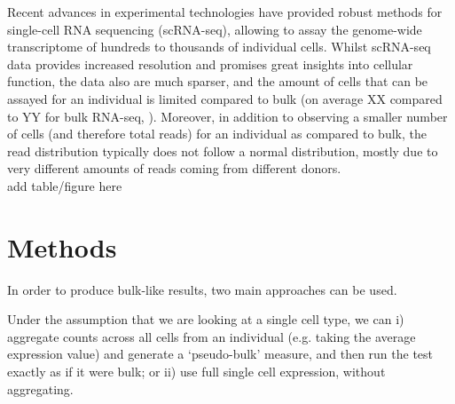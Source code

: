 
Recent advances in experimental technologies have provided robust methods for single-cell RNA sequencing (scRNA-seq), allowing to assay the genome-wide transcriptome of hundreds to thousands of individual cells. 
Whilst scRNA-seq data provides increased resolution and promises great insights into cellular function, the data also are much sparser, and the amount of cells that can be assayed for an individual is limited compared to bulk (on average XX compared to YY for bulk RNA-seq, \cite{}).
Moreover, in addition to observing a smaller number of cells (and therefore total reads) for an individual as compared to bulk, the read distribution typically does not follow a normal distribution, mostly due to very different amounts of reads coming from different donors. \\

add table/figure here


\section{Methods}

In order to produce bulk-like results, two main approaches can be used.

Under the assumption that we are looking at a single cell type, we can i) aggregate counts across all cells from an individual (e.g. taking the average expression value) and generate a `pseudo-bulk' measure, and then run the test exactly as if it were bulk; or ii) use full single cell expression, without aggregating.


